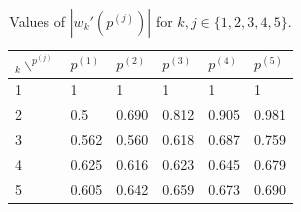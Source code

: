 \documentclass[12pt]{article}
\numberwithin{equation}{section}
\numberwithin{figure}{section}
\theoremstyle{definition}
\theoremstyle{plain}
\theoremstyle{plain}
\theoremstyle{plain}
\theoremstyle{remark}
\theoremstyle{plain}
\theoremstyle{plain}
\begin{document}
\begin{table}[h]
\caption{Values of $|w_k'(p^{(j)})|$ for $k,j \in \{1,2,3,4,5\}.$} %
\centering
\begin{tabular}{ |p{0.7cm}|p{1.5cm}|p{1.5cm}|p{1.5cm}|p{1.5cm}|p{1.5cm}|  }
 \hline
 $_{k} \backslash ^{p^{(j)}}$& $p^{(1)}$ &$p^{(2)}$&$p^{(3)}$ &$p^{(4)}$&$p^{(5)}$\\
 \hline
 1   & 1   &1 & 1    &1 & 1\\
 \hline
 2   & 0.5    &0.690 & 0.812    &0.905& 0.981\\
 \hline
 3   & 0.562    &0.560 & 0.618    &0.687 & 0.759\\
 \hline
 4   & 0.625    &0.616 & 0.623    &0.645 & 0.679\\
 \hline
 5   & 0.605    &0.642 & 0.659    &0.673 & 0.690\\
 \hline
\end{tabular}
 \label{table:absvalue_fixpoints} %
\end{table}


\end{document}
